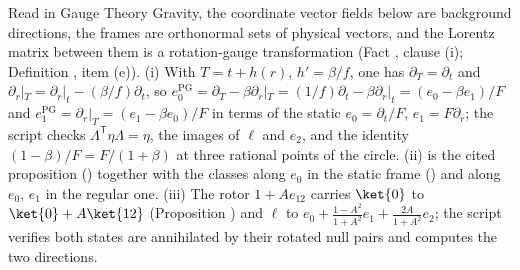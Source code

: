 Read in Gauge Theory Gravity, the coordinate vector fields below are background directions, the frames are orthonormal sets of physical vectors, and the Lorentz matrix between them is a rotation-gauge transformation (Fact , clause (i); Definition , item (e)). (i) With $T = t + h(r)$, $h' = \beta/f$, one has $\partial_{T} = \partial_{t}$ and $\partial_{r}|_{T} = \partial_{r}|_{t} - (\beta/f)\partial_{t}$, so $e_{0}^{\mathrm{PG}} = \partial_{T} - \beta\partial_{r}|_{T} = (1/f)\partial_{t} - \beta\partial_{r}|_{t} = (e_{0} - \beta e_{1})/F$ and $e_{1}^{\mathrm{PG}} = \partial_{r}|_{T} = (e_{1} - \beta e_{0})/F$ in terms of the static $e_{0} = \partial_{t}/F$, $e_{1} = F\partial_{r}$; the script checks $\Lambda^{\mathsf T}\eta\Lambda = \eta$, the images of $\ell$ and $e_{2}$, and the identity $(1 - \beta)/F = F/(1 + \beta)$ at three rational points of the circle. (ii) is the cited proposition () together with the classes along $e_{0}$ in the static frame () and along $e_{0}$, $e_{1}$ in the regular one. (iii) The rotor $1 + Ae_{12}$ carries $\ket{0}$ to $\ket{0} + A\ket{12}$ (Proposition ) and $\ell$ to $e_{0} + \frac{1 - A^{2}}{1 + A^{2}}e_{1} + \frac{2A}{1 + A^{2}}e_{2}$; the script verifies both states are annihilated by their rotated null pairs and computes the two directions.
